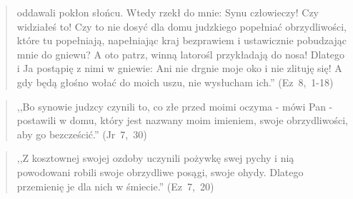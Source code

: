 \documentclass[10pt,a4paper,oneside]{article}
\begin{document}
\begin{quote}
oddawali pokłon słońcu. Wtedy rzekł do mnie: Synu człowieczy! Czy widziałeś to! Czy to nie dosyć dla domu judzkiego popełniać obrzydliwości, które tu popełniają, napełniając kraj bezprawiem i ustawicznie pobudzając mnie do gniewu? A oto patrz, winną latorośl przykładają do nosa! Dlatego i Ja postąpię z nimi w gniewie: Ani nie drgnie moje oko i nie zlituję się! A gdy będą głośno wołać do moich uszu, nie wysłucham ich.'' \mbox{(Ez 8, 1-18)}
\end{quote}
\begin{quote}
,,Bo synowie judzcy czynili to, co złe przed moimi oczyma - mówi Pan - postawili w domu, który jest nazwany moim imieniem, swoje obrzydliwości, aby go bezcześcić.'' \mbox{(Jr 7, 30)}
\end{quote}
\begin{quote}
,,Z kosztownej swojej ozdoby uczynili pożywkę swej pychy i nią powodowani robili swoje obrzydliwe posągi, swoje ohydy. Dlatego przemienię je dla nich w śmiecie.'' \mbox{(Ez 7, 20)}
\end{quote}
\end{document}
